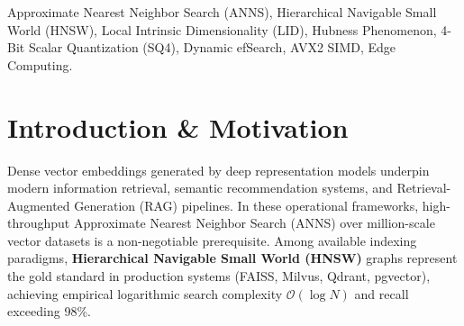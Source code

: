 \documentclass[conference,10pt]{IEEEtran}
\begin{document}
\begin{abstract}
AdaptiveVec introduces: (1) a \textit{Layer-Decoupled Dynamic Allocation Policy} that scales per-node degree while compressing higher-layer express links; (2) \textit{Streaming Online Welford Tracking} with exponential decay; (3) a \textit{Hubness-Aware In-Degree Regulation Heuristic} that penalizes high-degree bottleneck vertices; (4) \textit{Distance Stagnation Early Exit} to truncate futile search hops; (5) \textit{Dual-Stage Asymmetric Scalar Quantization (SQ8 \& Ultra-Edge 4-Bit SQ4)} with AVX2 SIMD sub-byte nibble interleaving and exact float32 re-ranking; and (6) \textit{Query-Time Dynamic Manifold-Aware efSearch} that modulates candidate beam width based on online query difficulty. Evaluated on SIFT-100K ($N=100\text{K}, D=128$, Texmex IRISA) and Synthetic-Multi-Cluster ($N=50\text{K}, D=64$), AdaptiveVec delivers a \textbf{7.4\% reduction in graph edges}, up to \textbf{+50.3\% higher query throughput (7,075.3 QPS vs. 4,708.1 QPS baseline)} via stagnation early-exit, \textbf{+35.1\% QPS gain at zero recall degradation (8,568.3 QPS vs. 6,341.2 QPS)} via query-time dynamic $efSearch$, and up to \textbf{72.7\% total index memory reduction (16.08 MB vs. 58.82 MB)} via ultra-edge 4-bit scalar quantization (SQ4) while boosting search throughput to \textbf{10,809.8 QPS (+36.7\% vs. FP32)} at \textbf{0.9511 Recall@10} on commodity hardware (Intel Core 5 210H, 8 cores/12 threads, AVX2/FMA, 16GB RAM).
\end{abstract}

\begin{IEEEkeywords}
Approximate Nearest Neighbor Search (ANNS), Hierarchical Navigable Small World (HNSW), Local Intrinsic Dimensionality (LID), Hubness Phenomenon, 4-Bit Scalar Quantization (SQ4), Dynamic efSearch, AVX2 SIMD, Edge Computing.
\end{IEEEkeywords}

\section{Introduction \& Motivation}
Dense vector embeddings generated by deep representation models underpin modern information retrieval, semantic recommendation systems, and Retrieval-Augmented Generation (RAG) pipelines. In these operational frameworks, high-throughput Approximate Nearest Neighbor Search (ANNS) over million-scale vector datasets is a non-negotiable prerequisite. Among available indexing paradigms, \textbf{Hierarchical Navigable Small World (HNSW)} graphs \cite{malkov2020hnsw} represent the gold standard in production systems (FAISS, Milvus, Qdrant, pgvector), achieving empirical logarithmic search complexity $\mathcal{O}(\log N)$ and recall exceeding 98\%.
\end{document}
